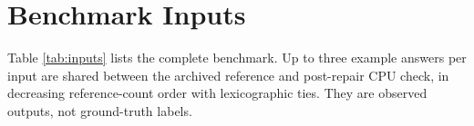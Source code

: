 \documentclass[10pt,letterpaper]{article}
\begin{document}
\section{Benchmark Inputs}\label{app:inputs}

Table \ref{tab:inputs} lists the complete benchmark. Up to three example answers per input
are shared between the archived reference and post-repair CPU check, in decreasing
reference-count order with lexicographic ties. They are observed outputs, not ground-truth
labels.


\end{document}
